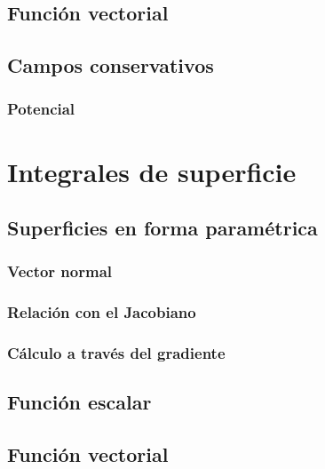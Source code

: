 \documentclass[12pt, fleqn]{report}                             %
\theoremstyle{break}                                            %
\begin{document}
            \subsection{Función vectorial}
            
            \subsection{Campos conservativos}
            
                \subsubsection{Potencial}
        
        \section{Integrales de superficie}
        
            \subsection{Superficies en forma paramétrica}
            
                \subsubsection{Vector normal}
            
                \subsubsection{Relación con el Jacobiano}
                
                \subsubsection{Cálculo a través del gradiente}
            
            \subsection{Función escalar}
            
            \subsection{Función vectorial}
        
\end{document}
